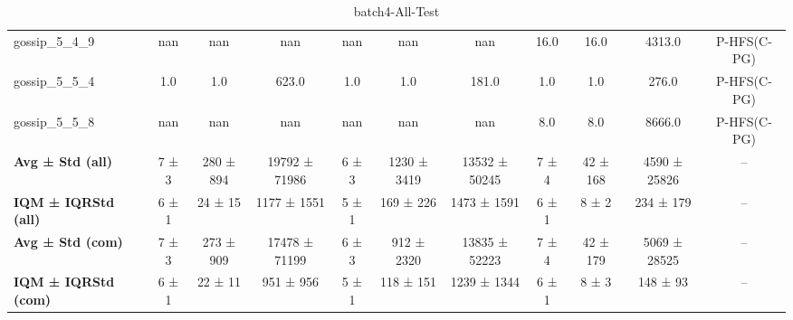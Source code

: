 \begin{table}[!ht]
\begin{tabular}{l|ccc|ccc|cccc}
gossip\_5\_4\_9 & nan & nan & nan & nan & nan & nan & 16.0 & 16.0 & 4313.0 & P-HFS(C-PG) \\
gossip\_5\_5\_4 & 1.0 & 1.0 & 623.0 & 1.0 & 1.0 & 181.0 & 1.0 & 1.0 & 276.0 & P-HFS(C-PG) \\
gossip\_5\_5\_8 & nan & nan & nan & nan & nan & nan & 8.0 & 8.0 & 8666.0 & P-HFS(C-PG) \\
\hline
\textbf{Avg ± Std (all)} & 7 ± 3 & 280 ± 894 & 19792 ± 71986 & 6 ± 3 & 1230 ± 3419 & 13532 ± 50245 & 7 ± 4 & 42 ± 168 & 4590 ± 25826 & -- \\
\textbf{IQM ± IQRStd (all)} & 6 ± 1 & 24 ± 15 & 1177 ± 1551 & 5 ± 1 & 169 ± 226 & 1473 ± 1591 & 6 ± 1 & 8 ± 2 & 234 ± 179 & -- \\
\textbf{Avg ± Std (com)} & 7 ± 3 & 273 ± 909 & 17478 ± 71199 & 6 ± 3 & 912 ± 2320 & 13835 ± 52223 & 7 ± 4 & 42 ± 179 & 5069 ± 28525 & -- \\
\textbf{IQM ± IQRStd (com)} & 6 ± 1 & 22 ± 11 & 951 ± 956 & 5 ± 1 & 118 ± 151 & 1239 ± 1344 & 6 ± 1 & 8 ± 3 & 148 ± 93 & -- \\
\end{tabular}
\caption{batch4-All-Test}
\label{tab:batch4_All_comparison_test}
\end{table}
